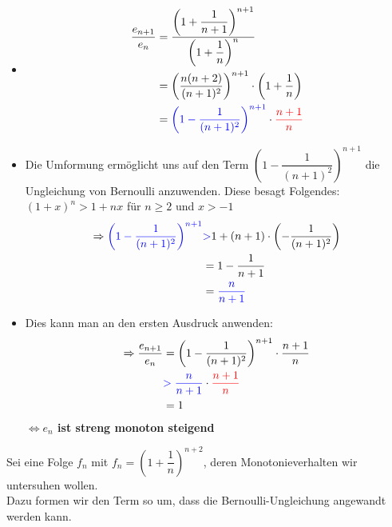 \begin{itemize}
\item\begin{align*}\dfrac{e_{n+1}}{e_{n}}&=\dfrac{{\left(1+\dfrac{1}{n+1}\right)}^{n+1}}{{\left(1+\dfrac{1}{n}\right)}^{n}}\\
&=\left(\dfrac{n(n+2)}{(n+1)^2}\right)^{n+1}\cdot\left(1+\dfrac{1}{n}\right)\\
&=\textcolor{blue}{\left(1-\dfrac{1}{(n+1)^2}\right)^{n+1}}\cdot\textcolor{red}{\dfrac{n+1}{n}}
\end{align*}
\item Die Umformung ermöglicht uns auf den Term $\left(1-\dfrac{1}{(n+1)^2}\right)^{n+1}$ die Ungleichung von Bernoulli anzuwenden. Diese besagt Folgendes: $(1+x)^n>1+nx$ für $n\geq2$ und $x>-1$\\
\begin{align*}\Rightarrow\textcolor{blue}{\left(1-\dfrac{1}{(n+1)^2}\right)^{n+1}}&\textcolor{blue}{  >} 1+(n+1)\cdot\left(-\dfrac{1}{(n+1)^2}\right)\\
&=1-\dfrac{1}{n+1}\\
&=\textcolor{blue}{\dfrac{n}{n+1}}
\end{align*}
\item Dies kann man an den ersten Ausdruck anwenden:\\
\begin{align*}
\Rightarrow\dfrac{e_{n+1}}{e_{n}}&=\left(1-\dfrac{1}{(n+1)^2}\right)^{n+1}\cdot\dfrac{n+1}{n}\\
&\textcolor{blue} {>\dfrac{n}{n+1}}\cdot\textcolor{red}{\dfrac{n+1}{n}}\\
&=1
\end{align*}
\textbf{$\Leftrightarrow e_{n}$ ist streng monoton steigend}
\end{itemize}
Sei eine Folge $f_{n}$ mit $f_{n}=\left(1+\dfrac{1}{n}\right)^{n+2}$, deren Monotonieverhalten wir untersuhen wollen.\\
Dazu formen wir den Term so um, dass die Bernoulli-Ungleichung angewandt werden kann.
